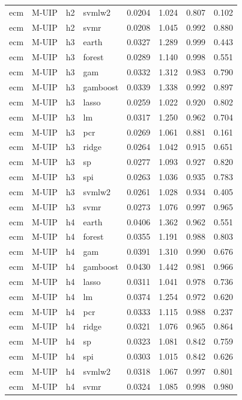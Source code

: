 \begin{ThreePartTable}
\begin{longtable}[t]{llclcccc}
ecm & M-UIP & h2 & svmlw2 & 0.0204 & 1.024 & 0.807 & 0.102\\
ecm & M-UIP & h2 & svmr & 0.0208 & 1.045 & 0.992 & 0.880\\
\addlinespace
ecm & M-UIP & h3 & earth & 0.0327 & 1.289 & 0.999 & 0.443\\
ecm & M-UIP & h3 & forest & 0.0289 & 1.140 & 0.998 & 0.551\\
ecm & M-UIP & h3 & gam & 0.0332 & 1.312 & 0.983 & 0.790\\
ecm & M-UIP & h3 & gamboost & 0.0339 & 1.338 & 0.992 & 0.897\\
ecm & M-UIP & h3 & lasso & 0.0259 & 1.022 & 0.920 & 0.802\\
ecm & M-UIP & h3 & lm & 0.0317 & 1.250 & 0.962 & 0.704\\
ecm & M-UIP & h3 & pcr & 0.0269 & 1.061 & 0.881 & 0.161\\
ecm & M-UIP & h3 & ridge & 0.0264 & 1.042 & 0.915 & 0.651\\
ecm & M-UIP & h3 & sp & 0.0277 & 1.093 & 0.927 & 0.820\\
ecm & M-UIP & h3 & spi & 0.0263 & 1.036 & 0.935 & 0.783\\
ecm & M-UIP & h3 & svmlw2 & 0.0261 & 1.028 & 0.934 & 0.405\\
ecm & M-UIP & h3 & svmr & 0.0273 & 1.076 & 0.997 & 0.965\\
\addlinespace
ecm & M-UIP & h4 & earth & 0.0406 & 1.362 & 0.962 & 0.551\\
ecm & M-UIP & h4 & forest & 0.0355 & 1.191 & 0.988 & 0.803\\
ecm & M-UIP & h4 & gam & 0.0391 & 1.310 & 0.990 & 0.676\\
ecm & M-UIP & h4 & gamboost & 0.0430 & 1.442 & 0.981 & 0.966\\
ecm & M-UIP & h4 & lasso & 0.0311 & 1.041 & 0.978 & 0.736\\
ecm & M-UIP & h4 & lm & 0.0374 & 1.254 & 0.972 & 0.620\\
ecm & M-UIP & h4 & pcr & 0.0333 & 1.115 & 0.988 & 0.237\\
ecm & M-UIP & h4 & ridge & 0.0321 & 1.076 & 0.965 & 0.864\\
ecm & M-UIP & h4 & sp & 0.0323 & 1.081 & 0.842 & 0.759\\
ecm & M-UIP & h4 & spi & 0.0303 & 1.015 & 0.842 & 0.626\\
ecm & M-UIP & h4 & svmlw2 & 0.0318 & 1.067 & 0.997 & 0.801\\
ecm & M-UIP & h4 & svmr & 0.0324 & 1.085 & 0.998 & 0.980\\

\end{longtable}
\end{ThreePartTable}
